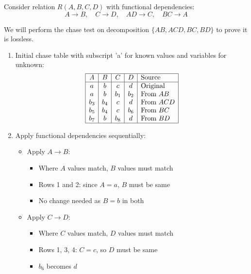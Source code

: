   \begin{example}
    \label{ex:chase-test-for-lossless-join-decomposition}
    Consider relation $R(A,B,C,D)$ with functional dependencies:
    \begin{equation}
      A \rightarrow B, \quad C \rightarrow D, \quad AD \rightarrow C, \quad BC \rightarrow A
    \end{equation}

    We will perform the chase test on decomposition $\{AB, ACD, BC, BD\}$ to prove it is lossless.

    \begin{enumerate}
    \item Initial chase table with subscript 'a' for known values and variables for unknown:
        \begin{equation}
          \begin{array}{|c|c|c|c|l|}
          \hline
          A & B & C & D & \text{Source} \\
          \hline
          a & b & c & d & \text{Original} \\
          a & b & b_1 & b_2 & \text{From }AB \\
          b_3 & b_4 & c & d & \text{From }ACD \\
          b_5 & b_4 & c & b_6 & \text{From }BC \\
          b_7 & b & b_8 & d & \text{From }BD \\
          \hline
          \end{array}
        \end{equation}

    \item Apply functional dependencies sequentially:

        \begin{itemize}
        \item Apply $A \rightarrow B$:
            \begin{itemize}
            \item Where $A$ values match, $B$ values must match
            \item Rows 1 and 2: since $A=a$, $B$ must be same
            \item No change needed as $B=b$ in both
            \end{itemize}

        \item Apply $C \rightarrow D$:
            \begin{itemize}
            \item Where $C$ values match, $D$ values must match
            \item Rows 1, 3, 4: $C=c$, so $D$ must be same
            \item $b_6$ becomes $d$
            \end{itemize}


\end{itemize}
\end{enumerate}
\end{example}
